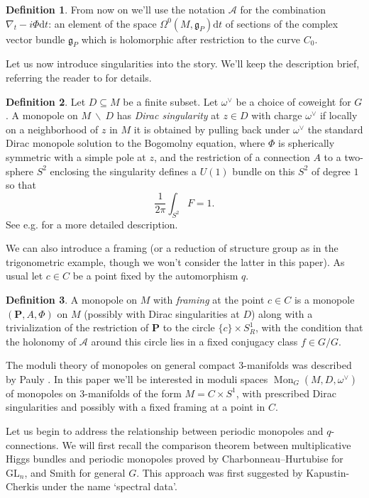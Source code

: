 \documentclass[11pt, oneside, reqno]{amsart}
\theoremstyle{definition} \newtheorem{definition}{Definition}[section]
\theoremstyle{definition} \newtheorem{remark}[definition]{Remark}
\theoremstyle{definition} \newtheorem{remarks}[definition]{Remarks}
\theoremstyle{definition} \newtheorem{question}[definition]{Question}
\theoremstyle{definition} \newtheorem*{note}{Note}
\theoremstyle{definition} \newtheorem{example}[definition]{Example}
\theoremstyle{definition} \newtheorem{examples}[definition]{Examples}
\renewcommand{\gg}{\mathfrak{g}}
\newcommand{\mc}[1]{\mathcal{#1}}
\newcommand{\bo}[1]{\boldsymbol{#1}}
\newcommand{\bs}{\ \backslash \ }
\newcommand{\GL}{\mathrm{GL}}
\newcommand{\sub}{\subseteq}
\DeclareMathOperator{\mon}{Mon}
\renewcommand{\d}{\mathrm{d}}
\begin{document}
\begin{definition} 
From now on we'll use the notation $\mc A$ for the combination $\nabla_t - i\Phi \d t$: an element of the space $\Omega^0(M, \gg_P)\d t$ of sections of the complex vector bundle $\gg_P$ which is holomorphic after restriction to the curve $C_0$. 
\end{definition}

Let us now introduce singularities into the story.  We'll keep the description brief, referring the reader to \cite{CharbonneauHurtubise, Smith} for details.
\begin{definition}
Let $D \sub M$ be a finite subset.  Let $\omega^\vee$ be a choice of coweight for $G$.  A monopole on $M \bs D$ has \emph{Dirac singularity} at $z \in D$ with charge $\omega^\vee$ if locally on a neighborhood of $z$ in $M$ it is obtained by pulling back under $\omega^\vee$ the standard Dirac monopole solution to the Bogomolny equation, where $\Phi$ is spherically symmetric with a simple pole at $z$, and the restriction of a connection $A$ to a two-sphere $S^2$ enclosing the singularity defines a $U(1)$ bundle on this $S^2$ of degree $1$ so that
    \[\frac{1}{2\pi} \int_{S^2} F = 1 .\]
  See e.g. \cite[Section 2.2]{CharbonneauHurtubise} for a more detailed description.
\end{definition}

We can also introduce a framing (or a reduction of structure group as in the trigonometric example, though we won't consider the latter in this paper).  As usual let $c \in C$ be a point fixed by the automorphism $q$.

\begin{definition}
A monopole on $M$ with \emph{framing} at the point $c \in C$ is a monopole $(\bo P,A,\Phi)$ on $M$ (possibly with Dirac singularities at $D$) along with a trivialization of the restriction of $\bo P$ to the circle $\{c\} \times S^1_R$, with the condition that the holonomy of $\mc A$ around this circle lies in a fixed conjugacy class $f \in G/G$.
\end{definition}

The moduli theory of monopoles on general compact 3-manifolds was described by Pauly \cite{Pauly}.  In this paper we'll be interested in moduli spaces $\mon_G(M, D, \omega^\vee)$ of monopoles on 3-manifolds of the form $M = C \times S^1$, with prescribed Dirac singularities and possibly with a fixed framing at a point in $C$.  

Let us begin to address the relationship between periodic monopoles and $q$-connections.  We will first recall the comparison theorem between multiplicative Higgs bundles and periodic monopoles proved by Charbonneau--Hurtubise \cite{CharbonneauHurtubise} for $\GL_n$, and Smith \cite{Smith} for general $G$. This approach was first suggested by Kapustin-Cherkis \cite{CherkisKapustin2} under the name `spectral data'. 
\end{document}
